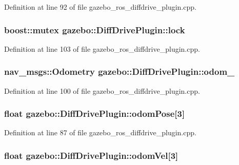 Definition at line 92 of file gazebo\_\-ros\_\-diffdrive\_\-plugin.cpp.

\subsubsection[{lock}]{\setlength{\rightskip}{0pt plus 5cm}boost::mutex {\bf gazebo::DiffDrivePlugin::lock}\hspace{0.3cm}{\ttfamily  [private]}}\label{classgazebo_1_1DiffDrivePlugin_ac5a7ec6de36b6a125c21fd4c6e023f39}


Definition at line 103 of file gazebo\_\-ros\_\-diffdrive\_\-plugin.cpp.

\subsubsection[{odom\_\-}]{\setlength{\rightskip}{0pt plus 5cm}nav\_\-msgs::Odometry {\bf gazebo::DiffDrivePlugin::odom\_\-}\hspace{0.3cm}{\ttfamily  [private]}}\label{classgazebo_1_1DiffDrivePlugin_ad4887a11cef015833063f0fa057ac74d}


Definition at line 100 of file gazebo\_\-ros\_\-diffdrive\_\-plugin.cpp.

\subsubsection[{odomPose}]{\setlength{\rightskip}{0pt plus 5cm}float {\bf gazebo::DiffDrivePlugin::odomPose}[3]\hspace{0.3cm}{\ttfamily  [private]}}\label{classgazebo_1_1DiffDrivePlugin_a93beaaaa93189aafdd6e4fdb261ecbde}


Definition at line 87 of file gazebo\_\-ros\_\-diffdrive\_\-plugin.cpp.

\subsubsection[{odomVel}]{\setlength{\rightskip}{0pt plus 5cm}float {\bf gazebo::DiffDrivePlugin::odomVel}[3]\hspace{0.3cm}{\ttfamily  [private]}}\label{classgazebo_1_1DiffDrivePlugin_a12d059a2841940a7623f0c17d9013a8b}


